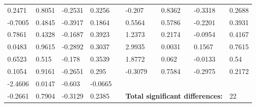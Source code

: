 \begin{table}[h!]
\begin{tabular}{lllllllll}
0.2471 & 0.8051 & -0.2531 & 0.3256 &  & -0.207 & 0.8362 & -0.3318 & 0.2688 \\
-0.7005 & 0.4845 & -0.3917 & 0.1864 &  & 0.5564 & 0.5786 & -0.2201 & 0.3931 \\
0.7861 & 0.4328 & -0.1687 & 0.3923 &  & 1.2373 & 0.2174 & -0.0954 & 0.4167 \\
0.0483 & 0.9615 & -0.2892 & 0.3037 &  & 2.9935 & 0.0031 & 0.1567 & 0.7615 \\
0.6523 & 0.515 & -0.178 & 0.3539 &  & 1.8772 & 0.062 & -0.0133 & 0.54 \\
0.1054 & 0.9161 & -0.2651 & 0.295 &  & -0.3079 & 0.7584 & -0.2975 & 0.2172 \\ \cline{6-9} 
-2.4606 & 0.0147 & -0.603 & -0.0665 &  &  &  &  &  \\
-0.2661 & 0.7904 & -0.3129 & 0.2385 &  & \multicolumn{3}{l}{\textbf{Total significant differences:}} & 22
\end{tabular}
\end{table}